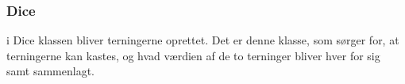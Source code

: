\subsubsection{Dice}
i Dice klassen bliver terningerne oprettet. Det er denne klasse, som sørger for, at terningerne kan kastes, og hvad værdien af de to terninger bliver hver for sig samt sammenlagt.